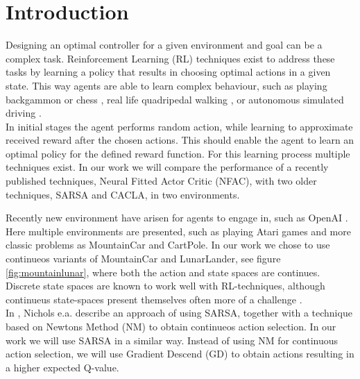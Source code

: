 
\section{Introduction}

Designing an optimal controller for a given environment and goal can be a complex task. Reinforcement Learning (RL) techniques exist to address these tasks by learning a policy that results in choosing optimal actions in a given state. This way agents are able to learn complex behaviour, such as playing backgammon \cite{tesauro2002programming} or chess \cite{baxter1999knightcap},
real life quadripedal walking \cite{kohl2004policy}, or autonomous simulated driving \cite{}. \\  %


In initial stages the agent performs random action, while learning to approximate received reward after the chosen actions. This should enable the agent to learn an optimal policy for the defined reward function. For this learning process multiple techniques exist. In our work we will compare the performance of a recently published techniques, Neural Fitted Actor Critic (NFAC), with two older techniques, SARSA and CACLA, in two environments.

Recently new environment have arisen for agents to engage in, such as OpenAI \cite{REFERENCE}. Here multiple environments are presented, such as playing Atari games and more classic problems as MountainCar and CartPole. In our work we chose to use continueos variants of MountainCar and LunarLander, see figure \ref{fig:mountainlunar}, where both the action and state spaces are continues. 
Discrete state spaces are known to work well with RL-techniques, although continueus state-spaces present themselves often more of a challenge \cite{TODO}. \\

In \cite{nichols2015continuous}, Nichols e.a. describe an approach of using SARSA, together with a technique based on Newtons Method (NM) to obtain continueos action selection. 
In our work we will use SARSA in a similar way. Instead of using NM for continuous action selection, we will use Gradient Descend (GD) to obtain actions resulting in a higher expected Q-value.






